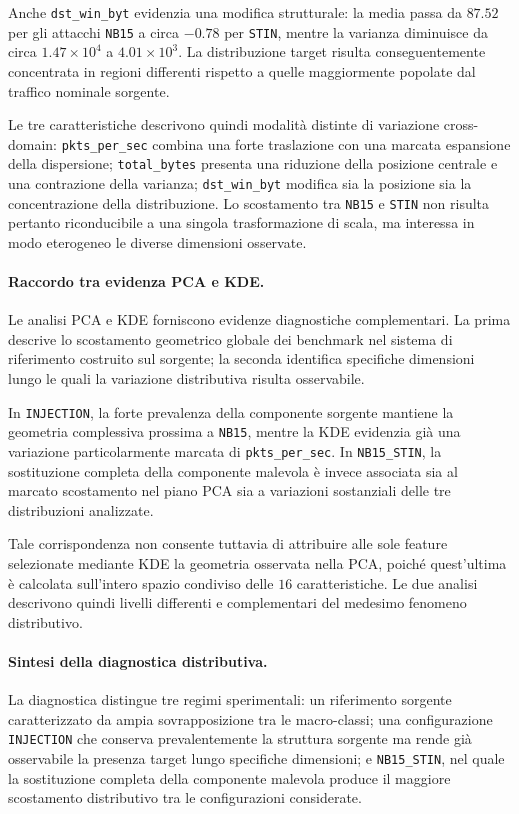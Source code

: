 Anche \texttt{dst\_win\_byt} evidenzia una modifica strutturale: la media passa da $87.52$ per gli attacchi \texttt{NB15} a circa $-0.78$ per \texttt{STIN}, mentre la varianza diminuisce da circa $1.47\times10^{4}$ a $4.01\times10^{3}$. 
La distribuzione target risulta conseguentemente concentrata in regioni differenti rispetto a quelle maggiormente popolate dal traffico nominale sorgente.

Le tre caratteristiche descrivono quindi modalità distinte di variazione cross-domain: \newline \texttt{pkts\_per\_sec} combina una forte traslazione con una marcata espansione della dispersione; \texttt{total\_bytes} presenta una riduzione della posizione centrale e una contrazione della varianza; \texttt{dst\_win\_byt} modifica sia la posizione sia la concentrazione della distribuzione. 
Lo scostamento tra \texttt{NB15} e \texttt{STIN} non risulta pertanto riconducibile a una singola trasformazione di scala, ma interessa in modo eterogeneo le diverse dimensioni osservate.

\paragraph{Raccordo tra evidenza PCA e KDE.}
Le analisi PCA e KDE forniscono evidenze diagnostiche complementari. 
La prima descrive lo scostamento geometrico globale dei benchmark nel sistema di riferimento costruito sul sorgente; la seconda identifica specifiche dimensioni lungo le quali la variazione distributiva risulta osservabile.

In \texttt{INJECTION}, la forte prevalenza della componente sorgente mantiene la geometria complessiva prossima a \texttt{NB15}, mentre la KDE evidenzia già una variazione particolarmente marcata di \texttt{pkts\_per\_sec}. 
In \texttt{NB15\_STIN}, la sostituzione completa della componente malevola è invece associata sia al marcato scostamento nel piano PCA sia a variazioni sostanziali delle tre distribuzioni analizzate.

Tale corrispondenza non consente tuttavia di attribuire alle sole feature selezionate mediante KDE la geometria osservata nella PCA, poiché quest'ultima è calcolata sull'intero spazio condiviso delle $16$ caratteristiche. 
Le due analisi descrivono quindi livelli differenti e complementari del medesimo fenomeno distributivo.

\paragraph{Sintesi della diagnostica distributiva.}
La diagnostica distingue tre regimi sperimentali: un riferimento sorgente caratterizzato da ampia sovrapposizione tra le macro-classi; una configurazione \texttt{INJECTION} che conserva prevalentemente la struttura sorgente ma rende già osservabile la presenza target lungo specifiche dimensioni; e \texttt{NB15\_STIN}, nel quale la sostituzione completa della componente malevola produce il maggiore scostamento distributivo tra le configurazioni considerate.

